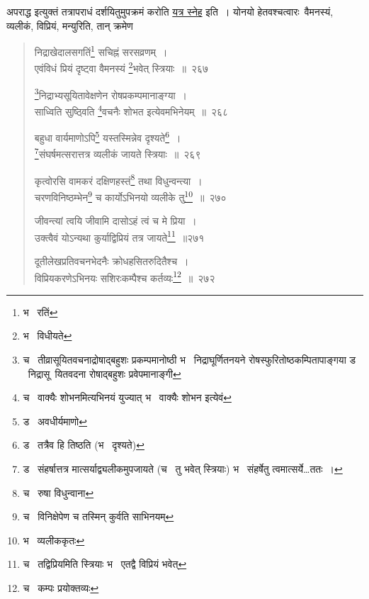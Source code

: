 \documentclass[11pt, openany]{book}
\begin{document}
अपराद्ध इत्युक्तं तत्रापराधं दर्शयितुमुपक्रमं करोति \underline{यत्र स्नेह} इति~। योनयो हेतवश्चत्वारः\textendash\ वैमनस्यं, व्यलीकं, विप्रियं, मन्युरिति, तान् क्रमेण

\newpage

\begin{quote}
{\na निद्राखेदालसगतिं\renewcommand{\thefootnote}{1}\footnote{भ \textendash\  रतिं} सचिह्नं सरसव्रणम्~।\\
एवंविधं प्रियं दृष्ट्वा वैमनस्यं \renewcommand{\thefootnote}{2}\footnote{भ \textendash\  विधीयते}भवेत् स्त्रियाः~॥~२६७

\renewcommand{\thefootnote}{3}\footnote{च \textendash\  तीव्रासूयितवचनाद्रोषाद्बहुशः प्रकम्पमानोष्ठी भ \textendash\  निद्राघूर्णितनयने रोषस्फुरितोष्ठकम्पितापाङ्गया ड \textendash\  निद्रासू\textendash\ यितवदना रोषाद्बहुशः प्रवेपमानाङ्गी}निद्राभ्यसूयितावेक्षणेन रोषप्रकम्पमानाङ्ग्या~।\\
साध्विति सुष्ठ्विति \renewcommand{\thefootnote}{4}\footnote{च \textendash\  वाक्यैः शोभनमित्यभिनयं युज्यात् भ \textendash\  वाक्यैः शोभन इत्येवं}वचनैः शोभत इत्येवमभिनेयम्~॥~२६८

बहुधा वार्यमाणोऽपि\renewcommand{\thefootnote}{5}\footnote{ड \textendash\  अवधीर्यमाणो} यस्तस्मिन्नेव दृश्यते\renewcommand{\thefootnote}{6}\footnote{ड \textendash\  तत्रैव हि तिष्ठति (भ \textendash\  दृश्यते)}~।\\
\renewcommand{\thefootnote}{7}\footnote{ड \textendash\  संहर्षात्तत्र मात्सर्याद्व्यलीकमुपजायते (च \textendash\  तु भवेत् स्त्रियाः) भ \textendash\  संहर्षेतु त्वमात्सर्ये\ldots ततः~।}संघर्षमत्सरात्तत्र व्यलीकं जायते स्त्रियाः~॥~२६९ 

कृत्वोरसि वामकरं दक्षिणहस्तं\renewcommand{\thefootnote}{8}\footnote{च \textendash\  रुषा विधुन्वाना} तथा विधुन्वन्त्या~।\\
चरणविनिष्ठम्भेन\renewcommand{\thefootnote}{9}\footnote{च \textendash\  विनिक्षेपेण च तस्मिन् कुर्वति साभिनयम्} च कार्योऽभिनयो व्यलीके तु\renewcommand{\thefootnote}{10}\footnote{भ \textendash\  व्यलीककृतः}~॥~२७०

जीवन्त्यां त्वयि जीवामि दासोऽहं त्वं च मे प्रिया~।\\
उक्त्वैवं योऽन्यथा कुर्याद्विप्रियं तत्र जायते\renewcommand{\thefootnote}{11}\footnote{च \textendash\  तद्विप्रियमिति स्त्रियाः भ \textendash\  एतद्वै विप्रियं भवेत्}~॥२७१

दूतीलेखप्रतिवचनभेदनैः क्रोधहसितरुदितैश्च~।\\
विप्रियकरणेऽभिनयः सशिरःकम्पैश्च कर्तव्यः\renewcommand{\thefootnote}{12}\footnote{च \textendash\  कम्पः प्रयोक्तव्यः}~॥~२७२}
\end{quote}
\end{document}
